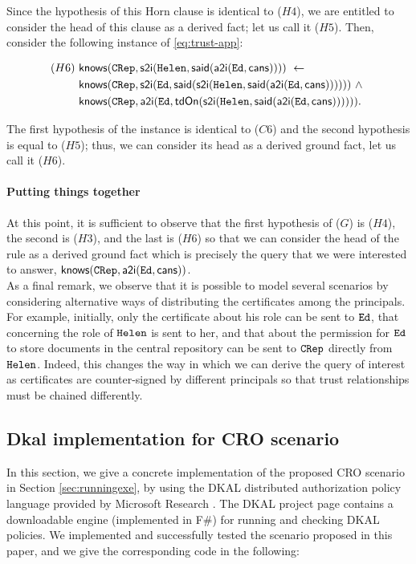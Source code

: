 \documentclass[conference]{llncs}
\newcommand{\Ed}{\ensuremath \mathtt{Ed}}
\newcommand{\Helen}{\ensuremath \mathtt{Helen}}
\newcommand{\CRep}{\ensuremath \mathtt{CRep}}
\newcommand{\canstoredoc}{\ensuremath \mathsf{cans}}
\newcommand{\know}{\ensuremath \mathsf{knows}}
\newcommand{\atoi}{\ensuremath \mathsf{a2i}}
\newcommand{\stoi}{\ensuremath \mathsf{s2i}}
\newcommand{\said}{\ensuremath \mathsf{said}}
\newcommand{\tdOn}{\ensuremath \mathsf{tdOn}}
\newcommand{\CRO}{CRO}
\begin{document}
{\noindent
Since the hypothesis of this Horn clause is identical to ($H4$), we are
entitled to consider the head of this clause as a derived fact; let us
call it ($H5$).  Then, consider the following instance of
\eqref{eq:trust-app}:

\begin{small}
\begin{align*}
   (H6)~ & \know(\CRep,\stoi(\Helen, \said(\atoi(\Ed, \canstoredoc)))) ~ \leftarrow  \\
   & \know(\CRep,\stoi(\Ed,\said(\stoi(\Helen, \said(\atoi(\Ed, \canstoredoc)))))) ~ \wedge ~\\
    & \know(\CRep,\atoi(\Ed,\tdOn(\stoi	(\Helen, \said(\atoi(\Ed, \canstoredoc)))))) .
\end{align*}
\end{small}

\noindent
The first hypothesis of the instance is identical to ($C6$) and the
second hypothesis is equal to ($H5$); thus, we can consider its head as
a derived ground fact, let us call it ($H6$).

\paragraph{Putting things together}  At this point, it is sufficient to
observe that the first hypothesis of ($G$) is ($H4$), the second is ($H3$),
and the last is ($H6$) so that we can consider the head of the rule as a
derived ground fact which is precisely the query that we were
interested to answer, $\know(\CRep,\atoi(\Ed, \canstoredoc))$.\\

As a final remark, we observe that it is possible to model several
scenarios by considering alternative ways of distributing the
certificates among the principals.  For example, initially, only the
certificate about his role can be sent to $\Ed$, that concerning the
role of $\Helen$ is sent to her, and that about the permission for
$\Ed$ to store documents in the central repository can be sent to
$\CRep$ directly from $\Helen$.  Indeed, this changes the way in which
we can derive the query of interest as certificates are counter-signed
by different principals so that trust relationships must be chained
differently. 



\subsection{Dkal implementation for \CRO{} scenario}
In this section, we give a concrete implementation of the proposed CRO scenario in Section \ref{sec:runningexe},
by using the DKAL distributed authorization policy language provided by Microsoft Research \cite{msr}. 
The DKAL project page \cite{dkalimpl} contains a downloadable engine (implemented in F$\#$) for running and checking DKAL policies. 
We implemented and successfully tested the scenario proposed in this paper, and we give the corresponding code in the following:\\

}
\end{document}
